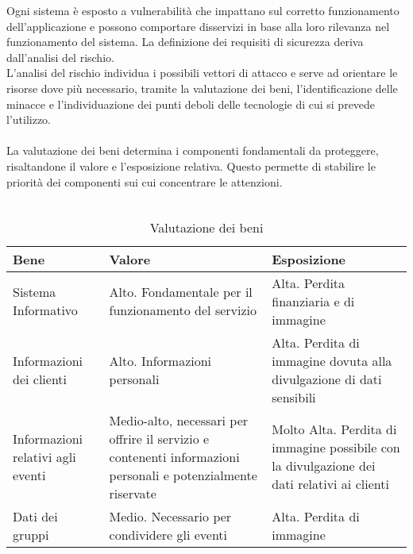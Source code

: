Ogni sistema è esposto a vulnerabilità che impattano sul corretto funzionamento dell'applicazione
e possono comportare disservizi in base alla loro rilevanza nel funzionamento del sistema.
La definizione dei requisiti di sicurezza deriva dall'analisi del rischio.\\
L'analisi del rischio individua i possibili vettori di attacco e serve ad orientare le risorse dove più necessario,
tramite la valutazione dei beni, l'identificazione delle minacce e 
l'individuazione dei punti deboli delle tecnologie di cui si prevede l'utilizzo.\\
\\
La valutazione dei beni determina i componenti fondamentali da proteggere,
risaltandone il valore e l'esposizione relativa.
Questo permette di stabilire le priorità dei componenti sui cui concentrare le attenzioni.\\
\\
\begin{table}[htb]
    \begin{tabular} {|P{3.5cm}|P{5.5cm}|P{6.7cm}|}
        \hline
        \textbf{Bene}                     & \textbf{Valore}                                                                                              & \textbf{Esposizione}      \\
        \hline
        Sistema Informativo               & Alto. Fondamentale per il funzionamento del servizio                                                         &
        Alta. Perdita finanziaria e di immagine                                                                                                                                      \\
        \hline
        Informazioni dei clienti          & Alto. Informazioni personali                                                                                 &
        Alta. Perdita di immagine dovuta alla divulgazione
        di dati sensibili                                                                                                                                                            \\
        \hline
        Informazioni relativi agli eventi & Medio-alto, necessari per offrire il servizio e contenenti informazioni personali e potenzialmente riservate &
        Molto Alta. Perdita di immagine possibile con la divulgazione dei dati relativi ai
        clienti                                                                                                                                                                      \\
        \hline
        Dati dei gruppi                   & Medio. Necessario per condividere gli eventi                                                                 & Alta. Perdita di immagine \\
        \hline
    \end{tabular}
    \caption{Valutazione dei beni}
\end{table}

